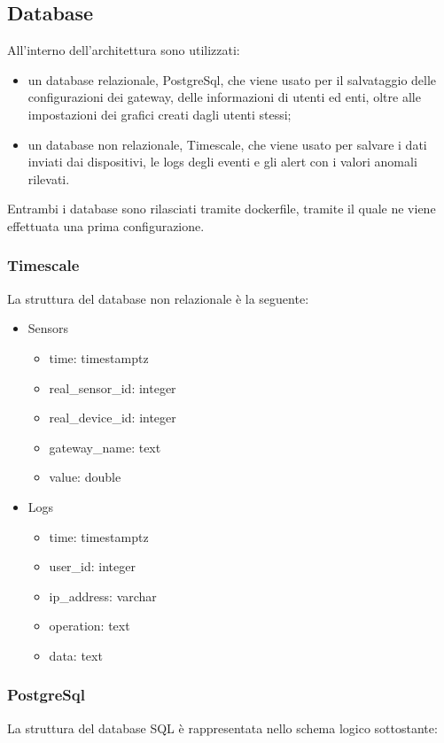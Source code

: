 \subsection{Database}
	All'interno dell'architettura sono utilizzati:
	\begin{itemize}
		\item un database relazionale, PostgreSql, che viene usato per il salvataggio delle configurazioni dei gateway, delle informazioni di utenti ed enti, oltre alle impostazioni dei grafici creati dagli utenti stessi;
		\item un database non relazionale, Timescale, che viene usato per salvare i dati inviati dai dispositivi, le logs degli eventi e gli alert con i valori anomali rilevati. 
	\end{itemize}
	Entrambi i database sono rilasciati tramite dockerfile, tramite il quale ne viene effettuata una prima configurazione.
	\subsubsection{Timescale}
	La struttura del database non relazionale è la seguente:
	\begin{itemize}
		\item Sensors
		\begin{itemize}
			\item time: timestamptz
			\item real\_sensor\_id: integer
			\item real\_device\_id: integer
			\item gateway\_name: text
			\item value: double
		\end{itemize}
		\item Logs
		\begin{itemize}
			\item time: timestamptz
			\item user\_id: integer
			\item ip\_address: varchar
			\item operation: text
			\item data: text
		\end{itemize}
	\end{itemize}
	\subsubsection{PostgreSql}
	La struttura del database SQL è rappresentata nello schema logico sottostante:
		

